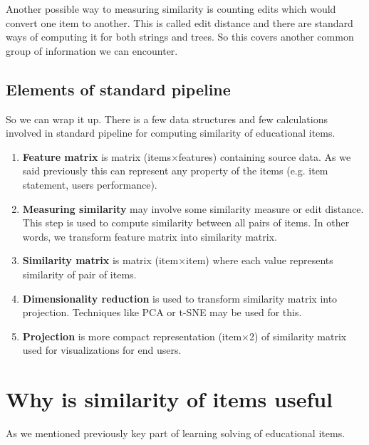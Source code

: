 \documentclass[
  digital, %
  table,   %
  nolof,     %
  nolot,     %
  nocover
]{fithesis3}
\begin{document}

Another possible way to measuring similarity is counting edits which would convert one item to another. This is called edit distance and there are standard ways of computing it for both strings and trees. So this covers another common group of information we can encounter.

\subsection{Elements of standard pipeline}\label{elements-of-standard-pipeline}

So we can wrap it up. There is a few data structures and few calculations involved in standard pipeline for computing similarity of educational items.

\begin{enumerate}
  \item
    \textbf{Feature matrix} is matrix (items$\times$features) containing source data. As we said previously this can represent any property of the items (e.g. item statement, users performance).
  \item
    \textbf{Measuring similarity} may involve some similarity measure or edit distance. This step is used to compute similarity between all pairs of items. In other words, we transform feature matrix into similarity matrix.
  \item
    \textbf{Similarity matrix} is matrix (item$\times$item) where each value represents similarity of pair of items.
  \item
    \textbf{Dimensionality reduction} is used to transform similarity matrix into projection. Techniques like PCA or t-SNE may be used for this.
  \item
    \textbf{Projection} is more compact representation (item$\times$2) of similarity matrix used for visualizations for end users.
\end{enumerate}

\section{Why is similarity of items useful}\label{why-is-similarity-of-items-useful}


As we mentioned previously key part of learning solving of educational
items.
\end{document}
